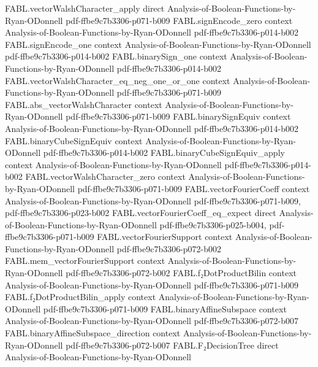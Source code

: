 \begin{theorem}
\proofstep
  {FABL.vectorWalshCharacter_apply}
  {direct}
  {Analysis-of-Boolean-Functions-by-Ryan-ODonnell}
  {pdf-ffbe9c7b3306-p071-b009}
\proofstep
  {FABL.signEncode_zero}
  {context}
  {Analysis-of-Boolean-Functions-by-Ryan-ODonnell}
  {pdf-ffbe9c7b3306-p014-b002}
\proofstep
  {FABL.signEncode_one}
  {context}
  {Analysis-of-Boolean-Functions-by-Ryan-ODonnell}
  {pdf-ffbe9c7b3306-p014-b002}
\proofstep
  {FABL.binarySign_one}
  {context}
  {Analysis-of-Boolean-Functions-by-Ryan-ODonnell}
  {pdf-ffbe9c7b3306-p014-b002}
\proofstep
  {FABL.vectorWalshCharacter_eq_neg_one_or_one}
  {context}
  {Analysis-of-Boolean-Functions-by-Ryan-ODonnell}
  {pdf-ffbe9c7b3306-p071-b009}
\proofstep
  {FABL.abs_vectorWalshCharacter}
  {context}
  {Analysis-of-Boolean-Functions-by-Ryan-ODonnell}
  {pdf-ffbe9c7b3306-p071-b009}
\proofstep
  {FABL.binarySignEquiv}
  {context}
  {Analysis-of-Boolean-Functions-by-Ryan-ODonnell}
  {pdf-ffbe9c7b3306-p014-b002}
\proofstep
  {FABL.binaryCubeSignEquiv}
  {context}
  {Analysis-of-Boolean-Functions-by-Ryan-ODonnell}
  {pdf-ffbe9c7b3306-p014-b002}
\proofstep
  {FABL.binaryCubeSignEquiv_apply}
  {context}
  {Analysis-of-Boolean-Functions-by-Ryan-ODonnell}
  {pdf-ffbe9c7b3306-p014-b002}
\proofstep
  {FABL.vectorWalshCharacter_zero}
  {context}
  {Analysis-of-Boolean-Functions-by-Ryan-ODonnell}
  {pdf-ffbe9c7b3306-p071-b009}
\proofstep
  {FABL.vectorFourierCoeff}
  {context}
  {Analysis-of-Boolean-Functions-by-Ryan-ODonnell}
  {pdf-ffbe9c7b3306-p071-b009,
    pdf-ffbe9c7b3306-p023-b002}
\proofstep
  {FABL.vectorFourierCoeff_eq_expect}
  {direct}
  {Analysis-of-Boolean-Functions-by-Ryan-ODonnell}
  {pdf-ffbe9c7b3306-p025-b004,
    pdf-ffbe9c7b3306-p071-b009}
\proofstep
  {FABL.vectorFourierSupport}
  {context}
  {Analysis-of-Boolean-Functions-by-Ryan-ODonnell}
  {pdf-ffbe9c7b3306-p072-b002}
\proofstep
  {FABL.mem_vectorFourierSupport}
  {context}
  {Analysis-of-Boolean-Functions-by-Ryan-ODonnell}
  {pdf-ffbe9c7b3306-p072-b002}
\proofstep
  {FABL.f₂DotProductBilin}
  {context}
  {Analysis-of-Boolean-Functions-by-Ryan-ODonnell}
  {pdf-ffbe9c7b3306-p071-b009}
\proofstep
  {FABL.f₂DotProductBilin_apply}
  {context}
  {Analysis-of-Boolean-Functions-by-Ryan-ODonnell}
  {pdf-ffbe9c7b3306-p071-b009}
\proofstep
  {FABL.binaryAffineSubspace}
  {context}
  {Analysis-of-Boolean-Functions-by-Ryan-ODonnell}
  {pdf-ffbe9c7b3306-p072-b007}
\proofstep
  {FABL.binaryAffineSubspace_direction}
  {context}
  {Analysis-of-Boolean-Functions-by-Ryan-ODonnell}
  {pdf-ffbe9c7b3306-p072-b007}
\proofstep
  {FABL.F₂DecisionTree}
  {direct}
  {Analysis-of-Boolean-Functions-by-Ryan-ODonnell}

\end{theorem}
